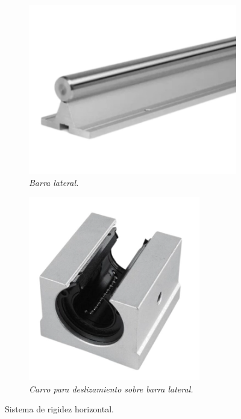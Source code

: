 \begin{figure}[H]
    \centering
    \begin{subfigure}{0.35\textwidth}
        \centering
        \includegraphics[width=\textwidth]{img/barra_lateral.png}
        \caption{\textit{Barra lateral.}}
        \label{fig:barra_lateral}
    \end{subfigure}
    \hfill
    \begin{subfigure}{0.3\textwidth}
        \centering
        \includegraphics[width=\textwidth]{img/sbr20uu.png}
        \caption{\textit{Carro para deslizamiento sobre barra lateral.}}
        \label{fig:sbr20uu}
    \end{subfigure}
    \caption{Sistema de rigidez horizontal.}
\end{figure}


